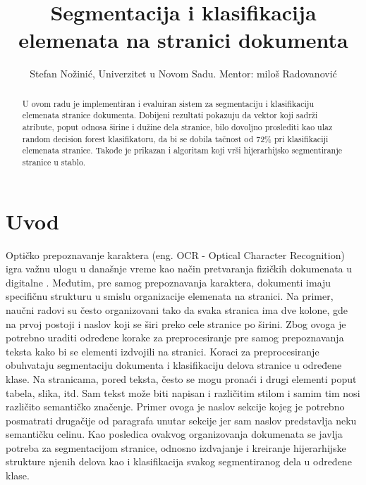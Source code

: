 \documentclass[]{amsart}
\begin{document}
\title{Segmentacija i klasifikacija elemenata na stranici dokumenta}
\author{Stefan Nožinić, Univerzitet u Novom Sadu. Mentor: miloš Radovanović}

\begin{abstract}
    U ovom radu je implementiran i evaluiran sistem za segmentaciju i klasifikaciju elemenata stranice dokumenta. 
	Dobijeni rezultati pokazuju da vektor koji sadrži atribute, poput odnosa širine i 
	dužine dela stranice, bilo dovoljno proslediti kao ulaz random decision
    forest klasifikatoru, da bi se dobila tačnost od 72\% pri klasifikaciji elemenata stranice. 
	Takođe je prikazan i algoritam koji vrši hijerarhijsko segmentiranje stranice u stablo.     
\end{abstract}


\maketitle



\section{Uvod}
\label{sec:org8295245}

Optičko prepoznavanje karaktera (eng. OCR - Optical Character Recognition) igra važnu ulogu u današnje vreme kao način pretvaranja fizičkih dokumenata u digitalne \cite{mori1999optical}.
Međutim, pre samog prepoznavanja karaktera, dokumenti imaju specifičnu strukturu u smislu organizacije elemenata na stranici. Na primer, naučni radovi su često
organizovani tako da svaka stranica ima dve kolone, gde na prvoj postoji i naslov koji se širi preko cele stranice po širini. Zbog ovoga je potrebno uraditi određene korake za preprocesiranje
pre samog prepoznavanja teksta kako bi se elementi izdvojili na stranici. Koraci za preprocesiranje obuhvataju segmentaciju dokumenta i klasifikaciju delova stranice u određene klase. 
Na stranicama, pored teksta, često se mogu pronaći i drugi elementi poput tabela, slika, itd.
Sam tekst može biti napisan i različitim stilom i samim tim nosi različito semantičko značenje. Primer ovoga je naslov sekcije kojeg je potrebno posmatrati
drugačije od paragrafa unutar sekcije jer sam naslov predstavlja neku semantičku celinu. 
Kao posledica ovakvog organizovanja dokumenata se javlja potreba za segmentacijom stranice, odnosno izdvajanje i kreiranje hijerarhijske strukture njenih delova kao i
klasifikacija svakog segmentiranog dela u određene klase.
\end{document}
